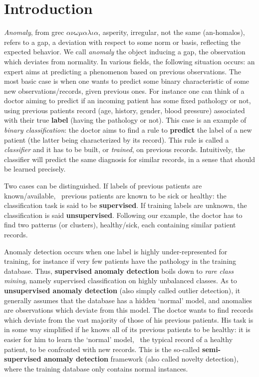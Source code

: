 
\section{Introduction}
\emph{Anomaly}, from grec $\alpha\nu\omega\mu\alpha\lambda\iota\alpha$, asperity, irregular, not the same (an-homalos), refers to a gap, a deviation with respect to some norm or basis, reflecting the expected behavior.
We call \emph{anomaly} the object inducing a gap, the observation which deviates from normality. 
%
In various fields, the following situation occurs: an expert aims at predicting a phenomenon based on previous observations. The most basic case is when one wants to predict some binary characteristic of some new observations/records, given previous ones. For instance one can think of a doctor aiming to predict if an incoming patient has some fixed pathology or not, using previous patients record (age, history, gender, blood pressure) associated with their true \textbf{label} (having the pathology or not). This case is an example of \emph{binary classification}: the doctor aims to find a rule to \textbf{predict} the label of a new patient (the latter being characterized by its record). This rule is called a \emph{classifier} and it has to be built, or \emph{trained}, on previous records. %
Intuitively, the classifier will predict the same diagnosis for similar records, in a sense that should be learned precisely.

Two cases can be distinguished. If labels of previous patients are known/available, \ie~previous patients are known to be sick or healthy: the classification task is said to be \textbf{supervised}. If training labels are unknown, the classification is said \textbf{unsupervised}. Following our example, the doctor has to find two patterns (or clusters), healthy/sick, each containing similar patient records.

Anomaly detection occurs when one label is highly under-represented for training, for instance if very few patients have the pathology in the training database.
Thus, \textbf{supervised anomaly detection} boils down to \emph{rare class mining}, namely supervised classification on highly unbalanced classes. 
As to \textbf{unsupervised anomaly detection} (also simply called outlier detection), it generally assumes that the database has a hidden `normal' model, and anomalies are observations which deviate from this model. The doctor wants to find records which deviate from the vast majority of those of his previous patients. 
%
His task is in some way simplified if he knows all of its previous patients to be healthy: it is easier for him to learn the `normal' model, \ie~the typical record of a healthy patient, to be confronted with new records. This is the so-called \textbf{semi-supervised anomaly detection} framework (also called novelty detection), where the training database only contains normal instances. 

